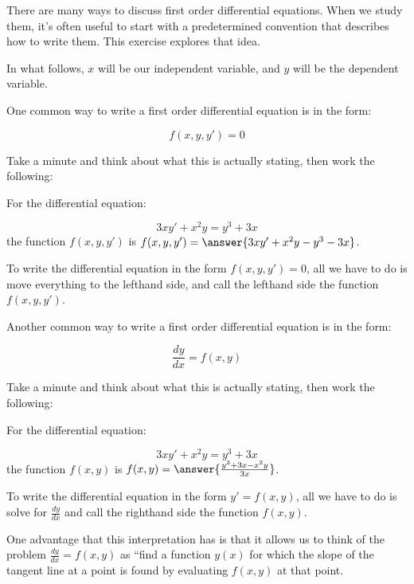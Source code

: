 \documentclass{ximera}
\author{Jim Talamo}
\begin{document}
\begin{exercise}

There are many ways to discuss first order differential equations.  When we study them, it's often useful to start with a predetermined convention that describes how to write them.  This exercise explores that idea.

In what follows, $x$ will be our independent variable, and $y$ will be the dependent variable.

\begin{exercise}
One common way to write a first order differential equation is in the form:

\[f(x,y,y')= 0 \]

Take a minute and think about what this is actually stating, then work the following:

For the differential equation:

\[
3xy'+x^2y=y^3+3x
\]
the function $f(x,y,y')$ is $f(x,y,y') = \answer{3xy'+x^2y-y^3-3x}$.

\begin{hint}
To write the differential equation in the form $f(x,y,y')= 0$, all we have to do is move everything to the lefthand side, and call the lefthand side the function $f(x,y,y')$.
\end{hint}
\end{exercise}

\begin{exercise}
Another common way to write a first order differential equation is in the form:

\[\frac{dy}{dx}= f(x,y) \]

Take a minute and think about what this is actually stating, then work the following:

For the differential equation:

\[
3xy'+x^2y=y^3+3x
\]
the function $f(x,y)$ is $f(x,y) = \answer{\frac{y^3+3x-x^2y}{3x}}$.

\begin{hint}
To write the differential equation in the form $y' = f(x,y)$, all we have to do is solve for $\frac{dy}{dx}$ and call the righthand side the function $f(x,y)$.
\end{hint}

One advantage that this interpretation has is that it allows us to think of the problem $\frac{dy}{dx}= f(x,y)$ as ``find a function $y(x)$ for which the slope of the tangent line at a point is found by evaluating $f(x,y)$ at that point.


\end{exercise}
\end{exercise}
\end{document}
